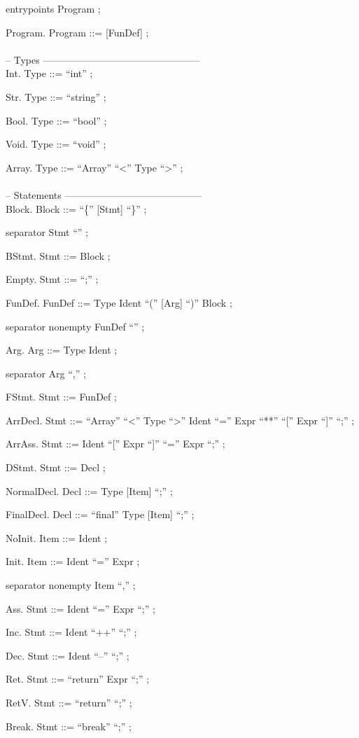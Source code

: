 \documentclass[a4paper]{article}
\begin{document}
entrypoints Program ;

Program. Program ::= [FunDef] ;
\\\\
\noindent
-- Types ------------------------------------------------\\

Int. Type ::= ``int'' ;

Str. Type ::= ``string'' ;

Bool. Type ::= ``bool'' ;

Void. Type ::= ``void'' ;

Array. Type ::= ``Array'' ``<'' Type ``>'' ;
\\\\
\noindent
-- Statements ------------------------------------------\\

Block. Block ::= ``\{'' [Stmt] ``\}'' ;

separator Stmt ``'' ;

BStmt. Stmt ::= Block ;

Empty. Stmt ::= ``;'' ;

FunDef. FunDef ::= Type Ident ``('' [Arg] ``)'' Block ;

separator nonempty FunDef ``'' ;

Arg. Arg ::= Type Ident ;

separator Arg ``,'' ;

FStmt. Stmt ::= FunDef ;

ArrDecl. Stmt ::= ``Array'' ``<'' Type ``>'' Ident ``='' Expr ``**'' ``['' Expr ``]'' ``;'' ;

ArrAss. Stmt ::= Ident ``['' Expr ``]'' ``='' Expr ``;'' ;

DStmt. Stmt ::= Decl ;

NormalDecl. Decl ::= Type [Item] ``;'' ;

FinalDecl. Decl ::= ``final'' Type [Item] ``;'' ;

NoInit. Item ::= Ident ;

Init. Item ::= Ident ``='' Expr ;

separator nonempty Item ``,'' ;

Ass. Stmt ::= Ident ``='' Expr ``;'' ;

Inc. Stmt ::= Ident ``++'' ``;'' ;

Dec. Stmt ::= Ident ``--'' ``;'' ;

Ret. Stmt ::= ``return'' Expr ``;'' ;

RetV. Stmt ::= ``return'' ``;'' ;

Break. Stmt ::= ``break'' ``;'' ;
\end{document}
